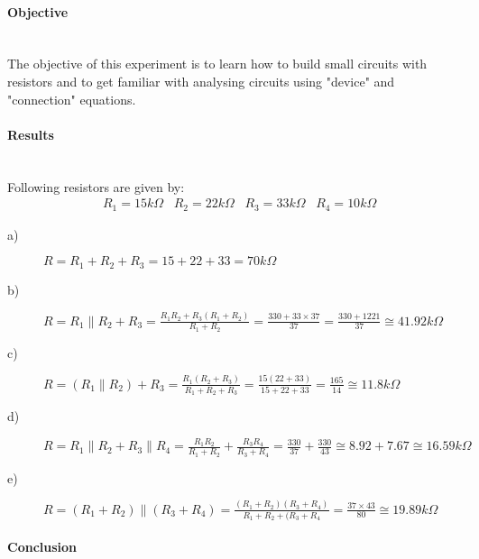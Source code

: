 \paragraph*{Objective} \hfill \\
The objective of this experiment is to learn how to build small circuits with resistors and to get familiar with analysing circuits using "device" and "connection" equations.

\paragraph*{Results} \hfill \\
Following resistors are given by: \hfill \\
\begin{align*}
& R_{1}=15k\Omega \,\,\,\,\,  R_{2}=22k\Omega \,\,\,\,\,  R_{3}=33k\Omega \,\,\,\,\, R_{4}=10k\Omega 
\end{align*}


\begin{description}
\item[a)] $ R=R_{1}+R_{2}+R_{3}= 15+22+33= 70k\Omega $ \hfill \\

\item[b)] $ R=R_{1} \parallel R_{2}+R_{3}= \frac{R_{1}R_{2}+R_{3}(R_{1}+R_{2})}{R_{1}+R_{2}}=\frac{330+33\times 37}{37}=\frac{330+1221}{37} \cong 41.92 k\Omega $ \hfill \\

\item[c)] $ R=(R_{1} \parallel R_{2})+R_{3}= \frac{R_{1}(R_{2}+R_{3})}{R_{1}+R_{2}+R_{3}}=\frac{15(22+33)}{15+22+33}=\frac{165}{14} \cong 11.8 k\Omega $ \hfill \\

\item[d)] $ R=R_{1}\parallel R_{2}+R_{3} \parallel R_{4} = \frac{R_{1}R_{2}}{R_{1}+R_{2}} +\frac{R_{3}R_{4}}{R_{3}+R_{4}} = \frac{330}{37}+\frac{330}{43} \cong 8.92+7.67 \cong 16.59 k\Omega $ \hfill \\

\item[e)] $ R=(R_{1}+R_{2}) \parallel (R_{3}+R_{4})= \frac{(R_{1}+R_{2})(R_{3}+R_{4})}{R_{1}+R_{2}+(R_{3}+R_{4}}= \frac{37\times 43}{80} \cong 19.89 k\Omega $ \hfill \\

\end{description}

\paragraph*{Conclusion} \hfill \\
